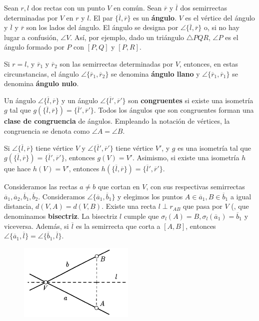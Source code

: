  Sean $r,l$ dos rectas con un punto $V$ en común. Sean $\overline{r}$ y $\overline{l}$ dos semirrectas determinadas por $V$ en $r$ y $l$. El par $\{\overline{l}, \overline{r} \}$ es un \textbf{ángulo}. $V$ es el vértice del ángulo y $\overline{l}$ y $\overline{r}$ son los lados del ángulo. El ángulo se designa por $\angle \{\overline{l}, \overline{r} \}$ o, si no hay lugar a confusión, $\angle V$. Así, por ejemplo, dado un triángulo $\triangle PQR$, $\angle P$ es el ángulo formado por $P$ con $[P,Q]$ y $[P,R]$.

 Si $r = l$, y $\overline{r}_1$ y $\overline{r}_2$ son las semirrectas determinadas por $V$, entonces, en estas circunstancias, el ángulo $\angle\{ \overline{r}_1, \overline{r}_2 \}$ se denomina \textbf{ángulo llano} y $\angle\{ \overline{r}_1, \overline{r}_1 \}$ se denomina \textbf{ángulo nulo}.

 Un ángulo $\angle \{\overline{l}, \overline{r} \}$ y un ángulo $\angle \{\overline{l}', \overline{r}' \}$ son \textbf{congruentes} si existe una isometría $g$ tal que $g(\{\overline{l}, \overline{r} \}) = \{\overline{l}', \overline{r}'\} $. Todos los ángulos que son congruentes forman una \textbf{clase de congruencia} de ángulos. Empleando la notación de vértices, la congruencia se denota como $\angle A = \angle B$.

 Si  $\angle \{\overline{l}, \overline{r} \}$ tiene vértice $V$ y  $\angle \{\overline{l}', \overline{r}' \}$ tiene vértice $V'$, y $g$ es una isometría tal que $g(  \{\overline{l}, \overline{r} \}) =   \{\overline{l}', \overline{r}' \}$, entonces $g(V) = V'$. Asimismo, si existe una isometría $h$ que hace $h(V) = V'$, entonces  $h(  \{\overline{l}, \overline{r} \}) =   \{\overline{l}', \overline{r}' \}$.

 Consideramos las rectas $a \neq b$ que cortan en $V$, con sus respectivas semirrectas 
$\overline{a}_1, \overline{a}_2, \overline{b}_1, \overline{b}_2$. Consideramos $\angle \{\overline{a}_1, \overline{b}_1 \}$ y elegimos los puntos $A \in \overline{a}_1, B \in \overline{b}_1$ a igual distancia, $d(V,A) = d(V,B)$. Existe una recta $l \perp r_{AB}$ que pasa por $V$ (, que denominamos \textbf{bisectriz}. La bisectriz $l$ cumple que $\sigma_l(A) = B, \sigma_l(\overline{a}_1) = \overline{b}_1$ y viceversa. Además, si $\overline{l}$ es la semirrecta que corta a $[A,B]$, entonces $\angle \{\overline{a}_1, \overline{l} \} = \angle \{\overline{b}_1, \overline{l} \}$.

\begin{figure}[H]
	\centering
	\includegraphics[width=5.5cm]{figuras/4-9.png}
	\vspace{-1em}
\end{figure}

